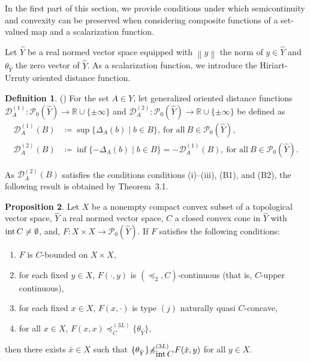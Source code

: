 \documentclass[a4paper,11pt]{jsarticle}
\theoremstyle{definition}
\newtheorem{dfn}{Definition}[section]
\newtheorem{prop}[dfn]{Proposition}
\newcommand{\rnum}{\mathbb{R}}
\newcommand{\Interior}[1]{\mbox{\rm int}\mbox{$\,#1$}}
\newcommand{\Norm}[1]{\left\lVert {#1} \right\rVert} %
\newcommand{\pow}[1]{\mathcal{P}_{0}(#1)}
\newcommand{\notsetrel}[2]{{\not\preccurlyeq}^{(#1)}_{#2}\!}
\begin{document}
In the first part of this section, we provide conditions under which
semicontinuity and convexity can be preserved when considering
composite functions of a set-valued map and a
scalarization function.

Let $\hat{Y}$ be a real normed vector space
equipped with $\Norm{y}$ the norm of $y \in \hat{Y}$
and $\theta_{\hat{Y}}$ the zero vector of $\hat{Y}$.
As a scalarization function,
we introduce the Hiriart-Urruty oriented distance function.

\begin{dfn}{(\cite{XuLi2016})}
  For the set $A \in Y$, let generalized oriented distance functions $\mathcal{D}^{(1)}_{A} \colon \pow{\hat{Y}} \to \rnum \cup \{\pm \infty\}$
  and $\mathcal{D}^{(2)}_{A} \colon \pow{\hat{Y}} \to \rnum \cup \{\pm \infty\}$ be defined as
  \begin{align*}
    \mathcal{D}^{(1)}_{A}(B) & \coloneq \sup\{\Delta_{A}(b) \mid b \in B\},\: \text{for all}\: B \in \pow{\hat{Y}},                              \\
    \mathcal{D}^{(2)}_{A}(B) & \coloneq \inf\{-\Delta_{A}(b) \mid b \in B\} = -\mathcal{D}^{(1)}_{A}(B),\: \text{for all}\: B \in \pow{\hat{Y}}.
  \end{align*}
\end{dfn}

As $\mathcal{D}^{(2)}_{A}(B)$ satisfies the conditions conditions (i)--(iii), (B1), and (B2),
the following result is obtained by Theorem~3.1.

\begin{prop}
  Let $X$ be a nonempty compact convex subset of a topological vector space,
  $\hat{Y}$ a real normed vector space, $C$ a closed convex cone in $\hat{Y}$ with $\Interior{C} \ne \emptyset$,
  and, $F\colon X \times X \to \pow{\hat{Y}}$.
  If $F$ satisfies the following conditions:
  \begin{enumerate}
    \item $F$ is $C$-bounded on $X \times X$,
    \item for each fixed $y \in X$, $F(\cdot,y)$ is $(\preccurlyeq_{2}, C)$-continuous (that is, $C$-upper continuous),
    \item for each fixed $x \in X$, $F(x,\cdot)$ is type $(j)$ naturally quasi $C$-concave,
    \item for all $x \in X$, $F(x,x) \preccurlyeq_{C}^{(3L)} \{\theta_{\hat{Y}}\}$,
  \end{enumerate}
  then there exists $\bar{x} \in X$ such that $\{\theta_{\hat{Y}}\} \notsetrel{3L}{\Interior{C}}\: F(\bar{x},y)$ for all $y \in X$.
\end{prop}
\end{document}
